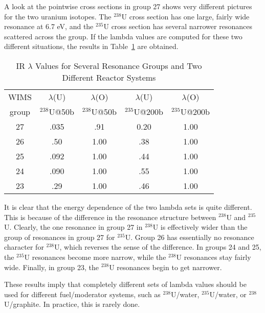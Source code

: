 A look at the pointwise cross sections in group 27 shows very different
pictures for the two uranium isotopes.  The $^{238}$U cross section has one
large, fairly wide resonance at 6.7 eV, and the $^{235}$U cross section has
several narrower resonances scattered across the group.  If the
lambda values are computed for these two different situations,  the
results in Table~\ref{lams} are obtained.

\begin{table}[b]
\begin{center}
\caption[Sample Intermediate Resonance $\lambda$ Values]{IR $\lambda$ Values
 for Several Resonance Groups and Two Different Reactor Systems}
\setlength{\extrarowheight}{1pt}
\begin{tabular}{c|cc|cc} \hline
 WIMS  &  $\lambda$(U)   &  $\lambda$(O)  & $\lambda$(U)  &  $\lambda$(O) \\
 group & $^{238}$U@50b   & $^{238}$U@50b   &  $^{235}$U@200b
  & $^{235}$U@200b  \\ \hline
 27  &  .035  &  .91  &  0.20  &  1.00 \\
 26  &  .50   &  1.00 & .38  &  1.00 \\
 25 &  .092  &  1.00  & .44  &  1.00  \\
 24  &  .090  &  1.00  &  .55  &  1.00  \\
 23  &  .29  &  1.00  &  .46  &  1.00 \\ \hline
\end{tabular}
\label{lams}
\end{center}
\end{table}

\newpage
It is clear that the energy dependence of the two lambda sets is quite
different.  This is because of the difference in the resonance structure
between $^{238}$U and $^{235}$U.  Clearly, the one resonance in group 27
in $^{238}$U
is effectively wider than the group of resonances in group 27 for $^{235}$U.
Group 26 has essentially no resonance character for $^{238}$U, which
reverses the sense of the difference. In groups 24 and 25, the $^{235}$U
resonances become more narrow, while the $^{238}$U resonances stay fairly
wide.  Finally, in group 23, the $^{238}$U resonances begin to get narrower.

These results imply that completely different sets of lambda
values should be used for different fuel/moderator systems, such as
$^{238}$U/water, $^{235}$U/water, or $^{238}$U/graphite.  In practice, this is
rarely done.

